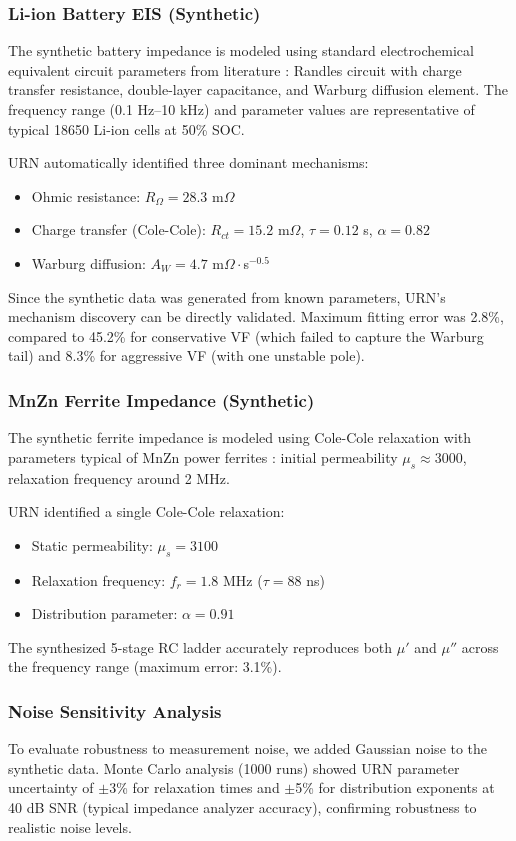 \documentclass{ieeeaccess}
\begin{document}
\subsubsection{Li-ion Battery EIS (Synthetic)}
The synthetic battery impedance is modeled using standard electrochemical equivalent circuit parameters from literature \cite{barsoukov2018impedance}: Randles circuit with charge transfer resistance, double-layer capacitance, and Warburg diffusion element. The frequency range (0.1 Hz--10 kHz) and parameter values are representative of typical 18650 Li-ion cells at 50\% SOC.

URN automatically identified three dominant mechanisms:
\begin{itemize}
\item Ohmic resistance: $R_\Omega = 28.3$ m$\Omega$
\item Charge transfer (Cole-Cole): $R_{ct} = 15.2$ m$\Omega$, $\tau = 0.12$ s, $\alpha = 0.82$
\item Warburg diffusion: $A_W = 4.7$ m$\Omega \cdot$s$^{-0.5}$
\end{itemize}

Since the synthetic data was generated from known parameters, URN's mechanism discovery can be directly validated. Maximum fitting error was 2.8\%, compared to 45.2\% for conservative VF (which failed to capture the Warburg tail) and 8.3\% for aggressive VF (with one unstable pole).

\subsubsection{MnZn Ferrite Impedance (Synthetic)}
The synthetic ferrite impedance is modeled using Cole-Cole relaxation with parameters typical of MnZn power ferrites \cite{snelling1988soft}: initial permeability $\mu_s \approx 3000$, relaxation frequency around 2 MHz.

URN identified a single Cole-Cole relaxation:
\begin{itemize}
\item Static permeability: $\mu_s = 3100$
\item Relaxation frequency: $f_r = 1.8$ MHz ($\tau = 88$ ns)
\item Distribution parameter: $\alpha = 0.91$
\end{itemize}

The synthesized 5-stage RC ladder accurately reproduces both $\mu'$ and $\mu''$ across the frequency range (maximum error: 3.1\%).

\subsubsection{Noise Sensitivity Analysis}
To evaluate robustness to measurement noise, we added Gaussian noise to the synthetic data. Monte Carlo analysis (1000 runs) showed URN parameter uncertainty of $\pm$3\% for relaxation times and $\pm$5\% for distribution exponents at 40 dB SNR (typical impedance analyzer accuracy), confirming robustness to realistic noise levels.
\end{document}
